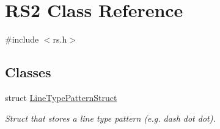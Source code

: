 \hypertarget{class_r_s2}{\section{R\-S2 Class Reference}
\label{class_r_s2}
}


{\ttfamily \#include $<$rs.\-h$>$}

\subsection*{Classes}
\begin{DoxyCompactItemize}
\item 
struct \hyperlink{struct_r_s2_1_1_line_type_pattern_struct}{Line\-Type\-Pattern\-Struct}
\begin{DoxyCompactList}\small\item\em Struct that stores a line type pattern (e.\-g. dash dot dot). \end{DoxyCompactList}\end{DoxyCompactItemize}
